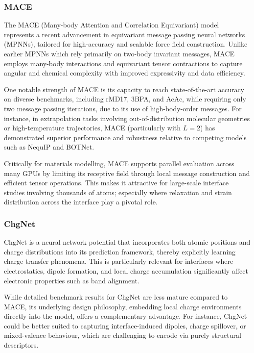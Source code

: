\subsubsection{MACE} 
 
The MACE (Many-body Attention and Correlation Equivariant) model represents a recent advancement in equivariant message passing neural networks (MPNNs), tailored for high-accuracy and scalable force field construction. Unlike earlier MPNNs which rely primarily on two-body invariant messages, MACE employs many-body interactions and equivariant tensor contractions to capture angular and chemical complexity with improved expressivity and data efficiency. 
 
One notable strength of MACE is its capacity to reach state-of-the-art accuracy on diverse benchmarks, including rMD17, 3BPA, and AcAc, while requiring only two message passing iterations, due to its use of high-body-order messages. For instance, in extrapolation tasks involving out-of-distribution molecular geometries or high-temperature trajectories, MACE (particularly with $L=2$) has demonstrated superior performance and robustness relative to competing models such as NequIP and BOTNet. 
 
Critically for materials modelling, MACE supports parallel evaluation across many GPUs by limiting its receptive field through local message construction and efficient tensor operations. This makes it attractive for large-scale interface studies involving thousands of atoms; especially where relaxation and strain distribution across the interface play a pivotal role. 
 
\subsubsection{ChgNet} 
 
ChgNet is a neural network potential that incorporates both atomic positions and charge distributions into its prediction framework, thereby explicitly learning charge transfer phenomena. This is particularly relevant for interfaces where electrostatics, dipole formation, and local charge accumulation significantly affect electronic properties such as band alignment. 
 
While detailed benchmark results for ChgNet are less mature compared to MACE, its underlying design philosophy, embedding local charge environments directly into the model, offers a complementary advantage. For instance, ChgNet could be better suited to capturing interface-induced dipoles, charge spillover, or mixed-valence behaviour, which are challenging to encode via purely structural descriptors. 
 
